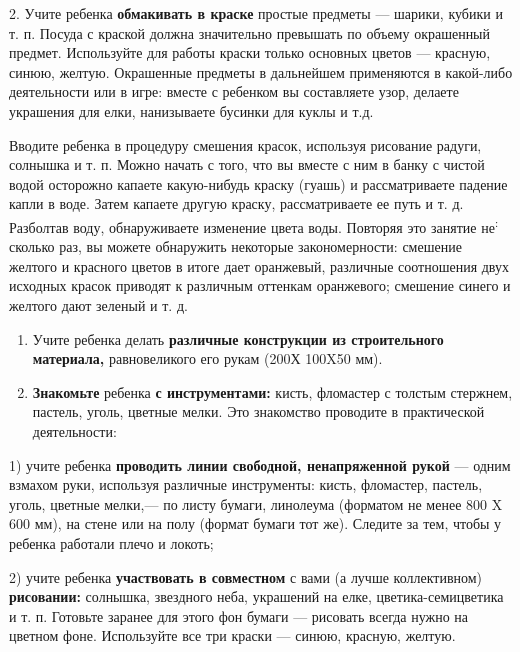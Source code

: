 \documentclass[a5paper]{book}
\begin{document}
2. Учите ребенка \textbf{обмакивать в краске} простые предметы ---
шарики, кубики и т. п. Посуда с краской должна значительно превышать по
объему окрашенный предмет. Используйте для работы краски только основных
цветов --- красную, синюю, желтую. Окрашенные предметы в дальнейшем
применяются в какой-либо деятельности или в игре: вместе с ребенком вы
составляете узор, делаете украшения для елки, нанизываете бусинки для
куклы и т.д.

Вводите ребенка в процедуру смешения красок, используя рисование радуги,
солнышка и т. п. Можно начать с того, что вы вместе с ним в банку с
чистой водой осторожно капаете какую-нибудь краску (гуашь) и
рассматриваете падение капли в воде. Затем капаете другую краску,
рассматриваете ее путь и т. д. Разболтав воду, обнаруживаете изменение
цвета воды. Повторяя это занятие не\textsuperscript{:} сколько раз, вы
можете обнаружить некоторые закономерности: смешение желтого и красного
цветов в итоге дает оранжевый, различные соотношения двух исходных
красок приводят к различным оттенкам оранжевого; смешение синего и
желтого дают зеленый и т. д.


\begin{enumerate}
\def\labelenumi{\arabic{enumi}.}
\setcounter{enumi}{2}
\item
  
  Учите ребенка делать \textbf{различные конструкции из строительного
  материала,} равновеликого его рукам (200Х 100X50 мм).
  
\item
  
  \textbf{Знакомьте} ребенка \textbf{с инструментами:} кисть, фломастер
  с толстым стержнем, пастель, уголь, цветные мелки. Это знакомство
  проводите в практической деятельности:
  
\end{enumerate}


1) учите ребенка \textbf{проводить линии свободной, ненапряженной рукой}
--- одним взмахом руки, используя различные инструменты: кисть,
фломастер, пастель, уголь, цветные мелки,--- по листу бумаги, линолеума
(форматом не менее 800 X 600 мм), на стене или на полу (формат бумаги
тот же). Следите за тем, чтобы у ребенка работали плечо и локоть;

2) учите ребенка \textbf{участвовать в совместном} с вами (а лучше
коллективном) \textbf{рисовании:} солнышка, звездного неба, украшений на
елке, цветика-семицветика и т. п. Готовьте заранее для этого фон бумаги
--- рисовать всегда нужно на цветном фоне. Используйте все три краски
--- синюю, красную, желтую.
\end{document}

